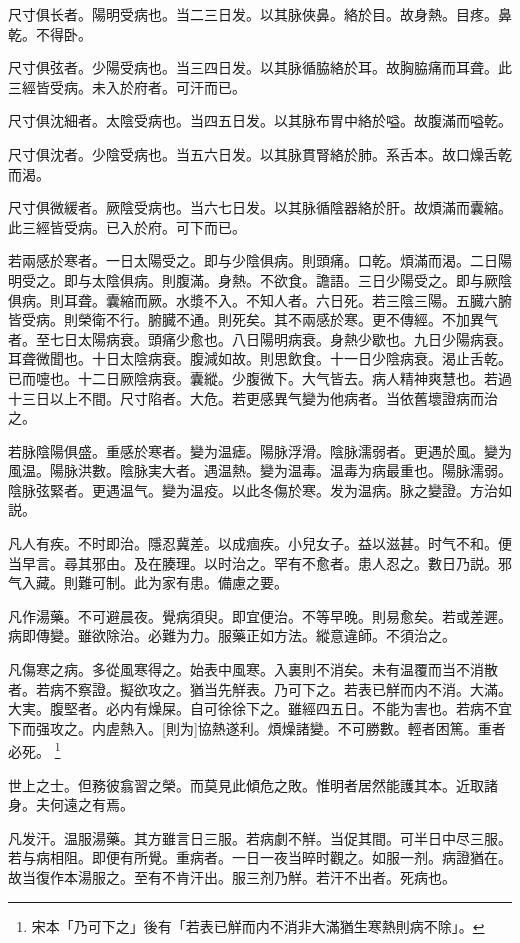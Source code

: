 \documentclass[12pt,twoside,UTF8,b5paper]{ctexbook}
\begin{document}
尺寸俱长者。陽明受病也。当二三日发。以其脉俠鼻。絡於目。故身熱。目疼。鼻乾。不得卧。

尺寸俱弦者。少陽受病也。当三四日发。以其脉循脇絡於耳。故胸脇痛而耳聋。此三經皆受病。未入於府者。可汗而已。

尺寸俱沈細者。太陰受病也。当四五日发。以其脉布胃中絡於嗌。故腹滿而嗌乾。

尺寸俱沈者。少陰受病也。当五六日发。以其脉貫腎絡於肺。系舌本。故口燥舌乾而渴。

尺寸俱微緩者。厥陰受病也。当六七日发。以其脉循陰器絡於肝。故煩滿而囊縮。此三經皆受病。已入於府。可下而已。

若兩感於寒者。一日太陽受之。即与少陰俱病。則頭痛。口乾。煩滿而渴。二日陽明受之。即与太陰俱病。則腹滿。身熱。不欲食。譫語。三日少陽受之。即与厥陰俱病。則耳聋。囊縮而厥。水漿不入。不知人者。六日死。若三陰三陽。五臓六腑皆受病。則榮衛不行。腑臓不通。則死矣。其不兩感於寒。更不傳經。不加異气者。至七日太陽病衰。頭痛少愈也。八日陽明病衰。身熱少歇也。九日少陽病衰。耳聋微聞也。十日太陰病衰。腹減如故。則思飲食。十一日少陰病衰。渴止舌乾。已而嚏也。十二日厥陰病衰。囊縱。少腹微下。大气皆去。病人精神爽慧也。若過十三日以上不間。尺寸陷者。大危。若更感異气變为他病者。当依舊壞證病而治之。

若脉陰陽俱盛。重感於寒者。變为温瘧。陽脉浮滑。陰脉濡弱者。更遇於風。變为風温。陽脉洪數。陰脉実大者。遇温熱。變为温毒。温毒为病最重也。陽脉濡弱。陰脉弦緊者。更遇温气。變为温疫。以此冬傷於寒。发为温病。脉之變證。方治如説。

凡人有疾。不时即治。隱忍冀差。以成痼疾。小兒女子。益以滋甚。时气不和。便当早言。尋其邪由。及在腠理。以时治之。罕有不愈者。患人忍之。數日乃説。邪气入藏。則難可制。此为家有患。備慮之要。

凡作湯藥。不可避晨夜。覺病須臾。即宜便治。不等早晚。則易愈矣。若或差遲。病即傳變。雖欲除治。必難为力。服藥正如方法。縱意違師。不須治之。

凡傷寒之病。多從風寒得之。始表中風寒。入裏則不消矣。未有温覆而当不消散者。若病不察證。擬欲攻之。猶当先觧表。乃可下之。若表已觧而内不消。大滿。大実。腹堅者。必内有燥屎。自可徐徐下之。雖經四五日。不能为害也。若病不宜下而强攻之。内虗熱入。[則为]協熱遂利。煩燥諸變。不可勝數。輕者困篤。重者必死。
	\footnote{宋本「乃可下之」後有「若表已觧而内不消非大滿猶生寒熱則病不除」。}

世上之士。但務彼翕習之榮。而莫見此傾危之敗。惟明者居然能護其本。近取諸身。夫何遠之有焉。

凡发汗。温服湯藥。其方雖言日三服。若病劇不觧。当促其間。可半日中尽三服。若与病相阻。即便有所覺。重病者。一日一夜当晬时觀之。如服一剂。病證猶在。故当復作本湯服之。至有不肯汗出。服三剂乃觧。若汗不出者。死病也。
\end{document}
